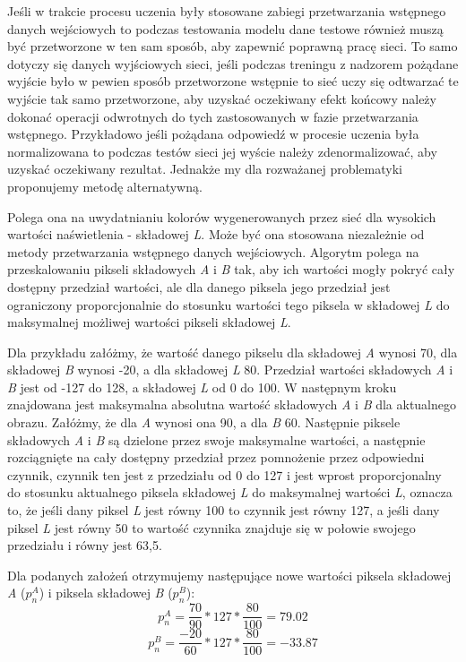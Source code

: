   Jeśli w trakcie procesu uczenia były stosowane zabiegi przetwarzania
  wstępnego danych wejściowych to podczas testowania modelu dane testowe również
  muszą być przetworzone w ten sam sposób, aby zapewnić poprawną pracę sieci.
  To samo dotyczy się danych wyjściowych sieci, jeśli podczas treningu z nadzorem
  pożądane wyjście było w pewien sposób przetworzone wstępnie to sieć uczy się
  odtwarzać te wyjście tak samo przetworzone, aby uzyskać oczekiwany efekt
  końcowy należy dokonać operacji odwrotnych do tych zastosowanych w fazie
  przetwarzania wstępnego. Przykładowo jeśli pożądana odpowiedź w procesie
  uczenia była normalizowana to podczas testów sieci jej wyście należy
  zdenormalizować, aby uzyskać oczekiwany rezultat. Jednakże my dla rozważanej
  problematyki proponujemy metodę alternatywną.

  Polega ona na uwydatnianiu kolorów wygenerowanych przez sieć dla wysokich
  wartości naświetlenia - składowej \textit{L}. Może być ona stosowana
  niezależnie od metody przetwarzania wstępnego danych wejściowych. Algorytm
  polega na przeskalowaniu pikseli składowych \textit{A} i \textit{B} tak, aby
  ich wartości mogły pokryć cały dostępny przedział wartości, ale dla danego
  piksela jego przedział jest ograniczony proporcjonalnie do stosunku wartości
  tego piksela w składowej \textit{L} do maksymalnej możliwej wartości pikseli
  składowej \textit{L}.

  Dla przykładu załóżmy, że wartość danego pikselu dla składowej \textit{A}
  wynosi 70, dla składowej \textit{B} wynosi -20, a dla składowej \textit{L} 80.
  Przedział wartości składowych \textit{A} i \textit{B} jest od -127 do 128, a
  składowej \textit{L} od 0 do 100. W następnym kroku znajdowana jest maksymalna
  absolutna wartość składowych \textit{A} i \textit{B} dla aktualnego obrazu.
  Załóżmy, że dla \textit{A} wynosi ona 90, a dla \textit{B} 60.
  Następnie piksele składowych \textit{A} i \textit{B} są dzielone przez
  swoje maksymalne wartości, a następnie rozciągnięte na cały dostępny przedział
  przez pomnożenie przez odpowiedni czynnik, czynnik ten jest z przedziału
  od 0 do 127 i jest wprost proporcjonalny do stosunku aktualnego piksela
  składowej \textit{L} do maksymalnej wartości \textit{L}, oznacza to, że jeśli
  dany piksel \textit{L} jest równy 100 to czynnik jest równy 127, a jeśli
  dany piksel \textit{L} jest równy 50 to wartość czynnika znajduje się w
  połowie swojego przedziału i równy jest 63,5.

  \noindent
  Dla podanych założeń otrzymujemy następujące nowe wartości piksela składowej \textit{A}
  ($p_{n}^{A}$) i piksela składowej \textit{B} ($p_{n}^{B}$):
  \begin{equation}
  p_{n}^{A} = \frac{70}{90} * 127 * \frac{80}{100} = 79.02
  \end{equation}
  \begin{equation}
  p_{n}^{B} = \frac{-20}{60} * 127 * \frac{80}{100} = -33.87
  \end{equation}

